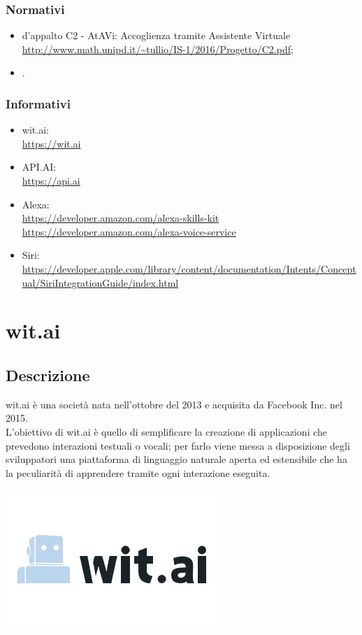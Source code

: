 \documentclass[a4paper,titlepage]{article}
\begin{document}
		\subsubsection{Normativi}
			\begin{itemize}
				\item {} d'appalto C2 - AtAVi: Accoglienza tramite Assistente Virtuale \\	\url{http://www.math.unipd.it/~tullio/IS-1/2016/Progetto/C2.pdf};
				\item \NPdoc.
			\end{itemize}
		\subsubsection{Informativi}
			\begin{itemize}
				\item wit.ai: \\
				\url{https://wit.ai}
				\item API.AI: \\
				\url{https://api.ai}
				\item Alexa: \\
				\url{https://developer.amazon.com/alexa-skills-kit} \\
				\url{https://developer.amazon.com/alexa-voice-service}
				\item Siri: \\
				\url{https://developer.apple.com/library/content/documentation/Intents/Conceptual/SiriIntegrationGuide/index.html}
			\end{itemize}
\newpage
\section{wit.ai}
	\subsection{Descrizione}
		\begin{minipage}{0.7\textwidth}\raggedright
			wit.ai è una società nata nell'ottobre del 2013 e acquisita da Facebook Inc. nel 2015. \\
			L'obiettivo di wit.ai è quello di semplificare la creazione di applicazioni che prevedono interazioni testuali o vocali; per farlo viene messa a disposizione degli sviluppatori una piattaforma di linguaggio naturale aperta ed estensibile che ha la peculiarità di apprendere tramite ogni interazione eseguita.
		\end{minipage}
		\hfill
		\noindent\begin{minipage}{0.15\textwidth}
		\includegraphics[scale=0.6]{images/witai.jpg}
		\end{minipage}
\end{document}
